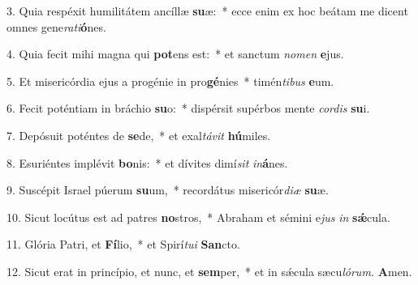 \item 3. Quia respéxit humilitátem ancíllæ \textbf{su}æ:~* ecce enim ex hoc beátam me dicent omnes gene\textit{rati}\textbf{ó}nes.

\item 4. Quia fecit mihi magna qui \textbf{pot}ens est:~* et sanctum \textit{nomen} \textbf{e}jus.

\item 5. Et misericórdia ejus a progénie in pro\textbf{gé}nies~* timén\textit{tibus} \textbf{e}um.

\item 6. Fecit poténtiam in bráchio \textbf{su}o:~* dispérsit supérbos mente \textit{cordis} \textbf{su}i.

\item 7. Depósuit poténtes de \textbf{se}de,~* et exal\textit{távit} \textbf{hú}miles.

\item 8. Esuriéntes implévit \textbf{bo}nis:~* et dívites dimí\hspace{0.03em}\textit{sit} \textit{in}\textbf{á}nes.

\item 9. Suscépit Israel púerum \textbf{su}um,~* recordátus misericór\textit{diæ} \textbf{su}æ.

\item 10. Sicut locútus est ad patres \textbf{no}stros,~* Abraham et sémini e\hspace{0.02em}\textit{jus} \textit{in} \textbf{sǽ}cula.

\item 11. Glória Patri, et \textbf{Fí}lio,~* et Spirí\hspace{0.03em}\textit{tui} \textbf{San}cto.

\item 12. Sicut erat in princípio, et nunc, et \textbf{sem}per,~* et in sǽcula sæcu\hspace{0.03em}\textit{lórum.} \textbf{A}men.